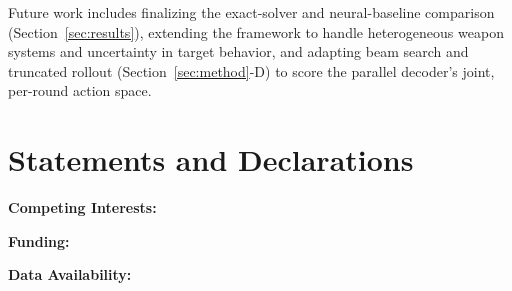 \documentclass[smallcondensed]{svjour3}
\begin{document}
Future work includes finalizing the exact-solver and neural-baseline comparison (Section~\ref{sec:results}), extending the framework to handle heterogeneous weapon systems and uncertainty in target behavior, and adapting beam search and truncated rollout (Section~\ref{sec:method}-D) to score the parallel decoder's joint, per-round action space.

\section*{Statements and Declarations}

\textbf{Competing Interests:} %

\textbf{Funding:} %

\textbf{Data Availability:} %



\end{document}
